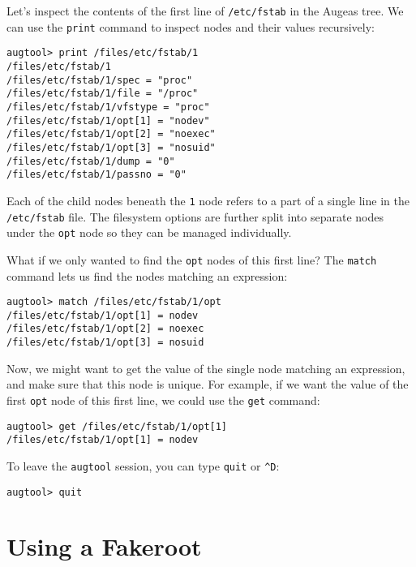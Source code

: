 
Let's inspect the contents of the first line of \verb!/etc/fstab! in the Augeas tree. We can use the \verb!print! command to inspect nodes and their values recursively:

\begin{verbatim}
augtool> print /files/etc/fstab/1
/files/etc/fstab/1
/files/etc/fstab/1/spec = "proc"
/files/etc/fstab/1/file = "/proc"
/files/etc/fstab/1/vfstype = "proc"
/files/etc/fstab/1/opt[1] = "nodev"
/files/etc/fstab/1/opt[2] = "noexec"
/files/etc/fstab/1/opt[3] = "nosuid"
/files/etc/fstab/1/dump = "0"
/files/etc/fstab/1/passno = "0"
\end{verbatim}

Each of the child nodes beneath the \verb!1! node refers to a part of a single line in the \verb!/etc/fstab! file. The filesystem options are further split into separate nodes under the \verb!opt! node so they can be managed individually.

What if we only wanted to find the \verb!opt! nodes of this first line? The \verb!match! command lets us find the nodes matching an expression:


\begin{verbatim}
augtool> match /files/etc/fstab/1/opt
/files/etc/fstab/1/opt[1] = nodev
/files/etc/fstab/1/opt[2] = noexec
/files/etc/fstab/1/opt[3] = nosuid
\end{verbatim}

Now, we might want to get the value of the single node matching an expression, and make sure that this node is unique. For example, if we want the value of the first \verb!opt! node of this first line, we could use the \verb!get! command:

\begin{verbatim}
augtool> get /files/etc/fstab/1/opt[1]
/files/etc/fstab/1/opt[1] = nodev
\end{verbatim}


To leave the \verb!augtool! session, you can type \verb!quit! or \verb!^D!:

\begin{verbatim}
augtool> quit
\end{verbatim}


\section{Using a Fakeroot}


